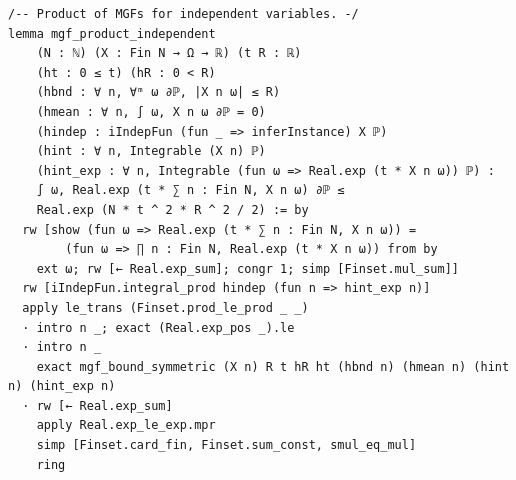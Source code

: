 \documentclass[11pt,a4paper]{article}
\theoremstyle{definition}
\theoremstyle{plain}
\theoremstyle{remark}
\begin{document}
\begin{leanblock}
\begin{lstlisting}
/-- Product of MGFs for independent variables. -/
lemma mgf_product_independent
    (N : ℕ) (X : Fin N → Ω → ℝ) (t R : ℝ)
    (ht : 0 ≤ t) (hR : 0 < R)
    (hbnd : ∀ n, ∀ᵐ ω ∂ℙ, |X n ω| ≤ R)
    (hmean : ∀ n, ∫ ω, X n ω ∂ℙ = 0)
    (hindep : iIndepFun (fun _ => inferInstance) X ℙ)
    (hint : ∀ n, Integrable (X n) ℙ)
    (hint_exp : ∀ n, Integrable (fun ω => Real.exp (t * X n ω)) ℙ) :
    ∫ ω, Real.exp (t * ∑ n : Fin N, X n ω) ∂ℙ ≤
    Real.exp (N * t ^ 2 * R ^ 2 / 2) := by
  rw [show (fun ω => Real.exp (t * ∑ n : Fin N, X n ω)) =
        (fun ω => ∏ n : Fin N, Real.exp (t * X n ω)) from by
    ext ω; rw [← Real.exp_sum]; congr 1; simp [Finset.mul_sum]]
  rw [iIndepFun.integral_prod hindep (fun n => hint_exp n)]
  apply le_trans (Finset.prod_le_prod _ _)
  · intro n _; exact (Real.exp_pos _).le
  · intro n _
    exact mgf_bound_symmetric (X n) R t hR ht (hbnd n) (hmean n) (hint n) (hint_exp n)
  · rw [← Real.exp_sum]
    apply Real.exp_le_exp.mpr
    simp [Finset.card_fin, Finset.sum_const, smul_eq_mul]
    ring


\end{lstlisting}
\end{leanblock}
\end{document}
